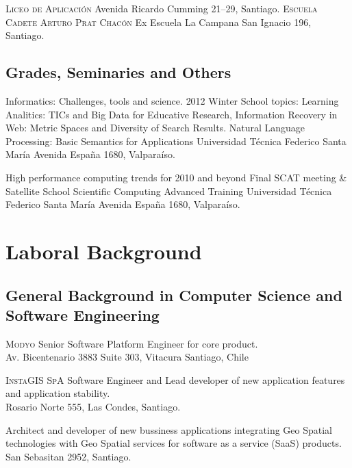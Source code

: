 \documentclass[11pt,letterpaper,roman]{moderncv}
\begin{document}
	{\textsc{Liceo de Aplicaci\'on}}
	{}
	{}
	{}
	{Avenida Ricardo Cumming 21--29, Santiago.}
	{\textsc{Escuela Cadete Arturo Prat Chac\'on}}
	{Ex Escuela La Campana}
	{}
	{}
	{San Ignacio 196, Santiago.}

\subsection{Grades, Seminaries and Others}

	{Informatics: Challenges, tools and science.}
	{2012 Winter School}
	{topics: Learning Analitics: TICs and Big Data for Educative Research, Information Recovery in Web: Metric Spaces and Diversity of Search Results. Natural Language Processing: Basic Semantics for Applications }
	{Universidad T\'ecnica Federico Santa Mar\'ia}
	{Avenida España 1680, Valpara\'iso.}
	
	
	{High performance computing trends for 2010 and beyond}
	{Final SCAT meeting \& Satellite School}
	{Scientific Computing Advanced Training}
	{Universidad T\'ecnica Federico Santa Mar\'ia}
	{Avenida España 1680, Valpara\'iso.}


\section{Laboral Background}

\subsection{General Background in Computer Science and Software Engineering}


	 {\se} {\textsc{Modyo}} {\stgo} {}
	{Senior Software Platform Engineer for core product.
	\\ Av. Bicentenario 3883 Suite 303, Vitacura Santiago, Chile
	} 

	 {\se} {\textsc{InstaGIS SpA}} {\stgo} {}
	{Software Engineer and Lead developer of new application features and application stability.
	\\ Rosario Norte 555, Las Condes, Santiago.
	} 

	 {\se} {\mapcity} {\stgo} {}
	{Architect and developer of new bussiness applications integrating Geo Spatial technologies with Geo Spatial services for software as a service (SaaS) products.
	\\ San Sebasitan 2952, Santiago.
	} 
\end{document}
